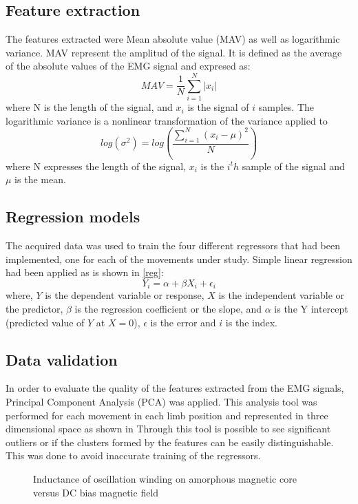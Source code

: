 \documentclass[a4paper, 10pt, conference]{ieeeconf}      %
\begin{document}
	\subsection{Feature extraction}
	The features extracted were Mean absolute value (MAV) as well as logarithmic variance. MAV represent the amplitud of the signal. It is defined as the average of the absolute values of the EMG signal and expresed as:
	\begin{equation}
	MAV = \frac{1}{N}\sum\limits_{i=1}^N|x_i|
	\end{equation}
	where N is the length of the signal, and $x_i$ is the signal of $i$ samples.
	The logarithmic variance is a nonlinear transformation of the variance applied to %
	\begin{equation} \label{eq:logvar}
	log(\sigma^2) = log(\frac{\sum\limits_{i=1}^N(x_i - \mu)^2}{N})
	\end{equation}
	where N expresses the length of the signal, $x_i$ is the $i^th$ sample of the signal and $\mu$ is the mean.
	\subsection{Regression models}
	The acquired data was used to train the four different regressors that had been implemented, one for each of the movements under study. Simple linear regression had been applied as is shown in \ref{reg}:
\begin{equation} \label{eq:simpleLinearRegression}
Y_i = \alpha + \beta X_i + \epsilon_i
\label{reg}
\end{equation}
where, $Y$ is the dependent variable or response, $X$ is the independent variable or the predictor, $\beta$ is the regression coefficient or the slope, and $\alpha$ is the Y intercept (predicted value of $Y$ at $X = 0$),  $\epsilon$ is the error and $i$ is the index.
	\subsection{Data validation}
	In order to evaluate the quality of the features extracted from the EMG signals, Principal Component Analysis (PCA) was applied. This analysis tool was performed for each movement in each limb position and represented in three dimensional space as shown in %
	Through this tool is  possible to see significant outliers or if the clusters formed by the features can be easily distinguishable. This was done to avoid inaccurate training of the regressors.
\begin{figure}[thpb]
	\centering
	\caption{Inductance of oscillation winding on amorphous
		magnetic core versus DC bias magnetic field}
	\label{figurelabel}
\end{figure}
\end{document}
